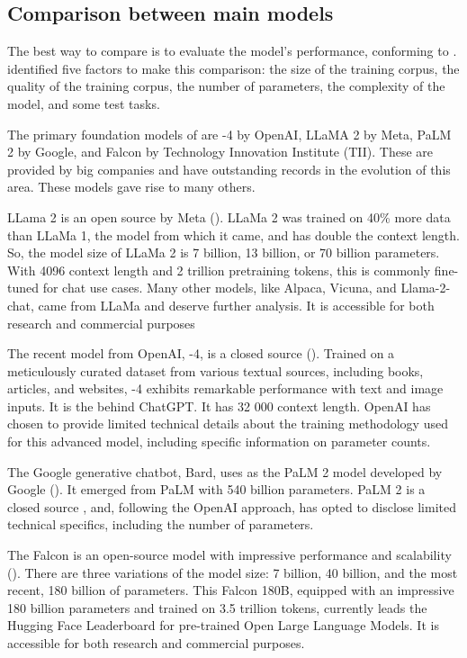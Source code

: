 

\subsection{Comparison between main models}

The best way to compare {\llm} is to evaluate the model's performance, conforming to \citet{hadi_LLM_2023}. \citet{hadi_LLM_2023} identified five factors to make this comparison: the size of the training corpus, the quality of the training corpus, the number of parameters, the complexity of the model, and some test tasks.

The primary foundation models of {\llm} are {\gpt}-4 by OpenAI, LLaMA 2 by Meta, PaLM 2 by Google, and Falcon by Technology Innovation Institute (TII). These {\llm} are provided by big companies and have outstanding records in the evolution of this area. These models gave rise to many others.

LLama 2 is an open source {\llm} by Meta (\citet{touvron_llama_2023}). LLaMa 2 was trained on 40\% more data than LLaMa 1, the model from which it came, and has double the context length. So, the model size of LLaMa 2 is 7 billion, 13 billion, or 70 billion parameters. With 4096 context length and 2 trillion pretraining tokens, this {\llm} is commonly fine-tuned for chat use cases. Many other models, like Alpaca, Vicuna, and Llama-2-chat, came from LLaMa and deserve further analysis. It is accessible for both research and commercial purposes

The recent {\gpt} model from OpenAI, {\gpt}-4, is a closed source {\llm} (\citet{openai_gpt-4_2023}). Trained on a meticulously curated dataset from various textual sources, including books, articles, and websites, {\gpt}-4 exhibits remarkable performance with text and image inputs. It is the {\llm} behind ChatGPT. It has 32 000 context length. OpenAI has chosen to provide limited technical details about the training methodology used for this advanced model, including specific information on parameter counts.

The Google generative chatbot, Bard, uses as {\llm} the PaLM 2 model developed by Google (\citet{anil_palm_2023}). It emerged from PaLM with 540 billion parameters. PaLM 2 is a closed source {\llm}, and, following the OpenAI approach, has opted to disclose limited technical specifics, including the number of parameters. 

The Falcon {\llm} is an open-source model with impressive performance and scalability (\citet{almazrouei_falcon_2023}). There are three variations of the model size: 7 billion, 40 billion, and the most recent, 180 billion of parameters. This Falcon 180B, equipped with an impressive 180 billion parameters and trained on 3.5 trillion tokens, currently leads the Hugging Face Leaderboard for pre-trained Open Large Language Models. It is accessible for both research and commercial purposes.

